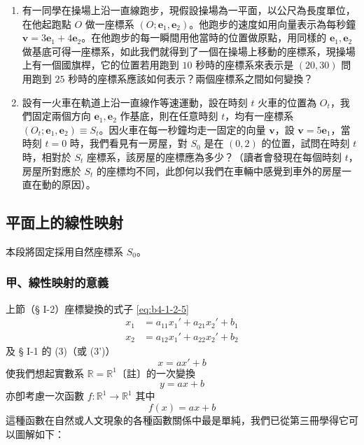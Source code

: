 \begin{enumerate}
  \item 有一同學在操場上沿一直線跑步，現假設操場為一平面，以公尺為長度單位，在他起跑點 $O$ 做一座標系 $(O; \mathbf{e}_1, \mathbf{e}_2)$。他跑步的速度如用向量表示為每秒鐘 $\mathbf{v} = 3\mathbf{e}_1 + 4\mathbf{e}_2$。在他跑步的每一瞬間用他當時的位置做原點，用同樣的 $\mathbf{e}_1, \mathbf{e}_2$ 做基底可得一座標系，如此我們就得到了一個在操場上移動的座標系，現操場上有一個國旗桿，它的位置若用跑到 $10$ 秒時的座標系來表示是 $(20, 30)$ 問用跑到 $25$ 秒時的座標系應該如何表示？兩個座標系之間如何變換？

  \item 設有一火車在軌道上沿一直線作等速運動，設在時刻 $t$ 火車的位置為 $O_t$，我們固定兩個方向 $\mathbf{e}_1, \mathbf{e}_2$ 作基底，則在任意時刻 $t$，均有一座標系 $(O_t; \mathbf{e}_1, \mathbf{e}_2) \equiv S_t$。因火車在每一秒鐘均走一固定的向量 $\mathbf{v}$，設 $\mathbf{v} = 5\mathbf{e}_1$，當時刻 $t = 0$ 時，我們看見有一房屋，對 $S_0$ 是在 $(0, 2)$ 的位置，試問在時刻 $t$ 時，相對於 $S_t$ 座標系，該房屋的座標應為多少？（讀者會發現在每個時刻 $t$，房屋所對應於 $S_t$ 的座標均不同，此卽何以我們在車輛中感覺到車外的房屋一直在動的原因）。
\end{enumerate}
\subsection{平面上的線性映射}
\label{sec:b4-1-3}

本段將固定採用自然座標系 $S_0$。

\subsubsection*{甲、線性映射的意義}

上節（§ I-2）座標變換的式子 \eqref{eq:b4-1-2-5}
\begin{align*}
x_1 &= a_{11}x_1' + a_{21}x_2' + b_1 \\
x_2 &= a_{12}x_1' + a_{22}x_2' + b_2
\end{align*}
及 § I-1 的 (3)（或 (3')）
\[ x = ax' + b \]
使我們想起實數系 $\mathbb{R} = \mathbb{R}^1$〔註〕的一次變換
\begin{equation}
y = ax + b \label{eq:b4-1-3-1}
\end{equation}
亦卽考慮一次函數 $f: \mathbb{R}^1 \to \mathbb{R}^1$ 其中
\begin{equation}
f(x) = ax + b \label{eq:b4-1-3-2}
\end{equation}
這種函數在自然或人文現象的各種函數關係中最是單純，我們已從第三冊學得它可以圖解如下：

